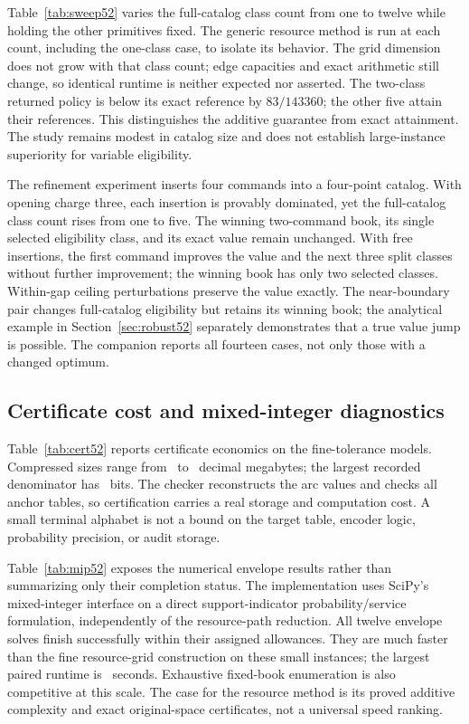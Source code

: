 Table~\ref{tab:sweep52} varies the full-catalog class count from one to twelve while holding the other primitives fixed. The generic resource method is run at each count, including the one-class case, to isolate its behavior. The grid dimension does not grow with that class count; edge capacities and exact arithmetic still change, so identical runtime is neither expected nor asserted. The two-class returned policy is below its exact reference by $83/143360$; the other five attain their references. This distinguishes the additive guarantee from exact attainment. The study remains modest in catalog size and does not establish large-instance superiority for variable eligibility.

The refinement experiment inserts four commands into a four-point catalog. With opening charge three, each insertion is provably dominated, yet the full-catalog class count rises from one to five. The winning two-command book, its single selected eligibility class, and its exact value remain unchanged. With free insertions, the first command improves the value and the next three split classes without further improvement; the winning book has only two selected classes. Within-gap ceiling perturbations preserve the value exactly. The near-boundary pair changes full-catalog eligibility but retains its winning book; the analytical example in Section~\ref{sec:robust52} separately demonstrates that a true value jump is possible. The companion reports all fourteen cases, not only those with a changed optimum.

\subsection{Certificate cost and mixed-integer diagnostics}
Table~\ref{tab:cert52} reports certificate economics on the fine-tolerance models. Compressed sizes range from \FineMinPacked\ to \FineMaxPacked\ decimal megabytes; the largest recorded denominator has \FineMaxDenBits\ bits. The checker reconstructs the arc values and checks all anchor tables, so certification carries a real storage and computation cost. A small terminal alphabet is not a bound on the target table, encoder logic, probability precision, or audit storage.

Table~\ref{tab:mip52} exposes the numerical envelope results rather than summarizing only their completion status. The implementation uses SciPy's mixed-integer interface \citep{Virtanen2020} on a direct support-indicator probability/service formulation, independently of the resource-path reduction. All twelve envelope solves finish successfully within their assigned allowances. They are much faster than the fine resource-grid construction on these small instances; the largest paired runtime is \MIPMaxSeconds\ seconds. Exhaustive fixed-book enumeration is also competitive at this scale. The case for the resource method is its proved additive complexity and exact original-space certificates, not a universal speed ranking.


